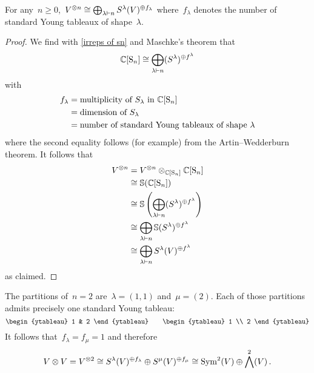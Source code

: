 \documentclass[a4paper,10pt]{scrartcl}
\begin{document}
\begin{corollary}
  For any~$n \geq 0$,~$V^{\otimes n} \cong \bigoplus_{\lambda \vdash n} S^{\lambda}(V)^{\oplus f_\lambda}$ where~$f_\lambda$ denotes the number of standard Young tableaux of shape~$\lambda$.
\end{corollary}


\begin{proof}
  We find with \cref{irreps of sn} and Maschke’s theorem that
  \[
    \mathbb{C}[\operatorname{S}_n]
    \cong
    \bigoplus_{\lambda \vdash n} (S^\lambda)^{\oplus f^\lambda}
  \]
  with
  \begin{align*}
    f_\lambda
    &=
    \text{multiplicity of~$S_\lambda$ in~$\mathbb{C}[\operatorname{S}_n]$}
    \\
    &=
    \text{dimension of~$S_\lambda$}
    \\
    &=
    \text{number of standard Young tableaux of shape~$\lambda$}
  \end{align*}
  where the second equality follows (for example) from the Artin--Wedderburn theorem.
  It follows that
  \begin{align*}
    V^{\otimes n}
    &=
    V^{\otimes n} \otimes_{\mathbb{C}[\operatorname{S}_n]} \mathbb{C}[\operatorname{S}_n]
    \\
    &\cong
    \mathbb{S}(\mathbb{C}[\operatorname{S}_n])
    \\
    &\cong
    \mathbb{S}\left( \bigoplus_{\lambda \vdash n} (S^\lambda)^{\oplus f^\lambda} \right)
    \\
    &\cong
    \bigoplus_{\lambda \vdash n} \mathbb{S}(S^\lambda)^{\oplus f^\lambda}
    \\
    &\cong
    \bigoplus_{\lambda \vdash n} S^{\lambda}(V)^{\oplus f^\lambda}
  \end{align*}
  as claimed.
\end{proof}


\begin{example}
  The partitions of~$n = 2$ are~$\lambda = (1,1)$ and~$\mu = (2)$.
  Each of those partitions admits precisely one standard Young tableau:
  \[
    \begin{ytableau}
      1 & 2
    \end{ytableau}
    \qquad
    \begin{ytableau}
      1 \\
      2
    \end{ytableau}
  \]
  It follows that~$f_\lambda = f_\mu = 1$ and therefore
  \[
    V \otimes V
    =
    V^{\otimes 2}
    \cong
    S^{\lambda}(V)^{\oplus f_\lambda}
    \oplus
    S^{\mu}(V)^{\oplus f_\mu}
    \cong
    \operatorname{Sym}^2(V) \oplus \bigwedge^2(V) \,.
  \]
\end{example}
\end{document}
